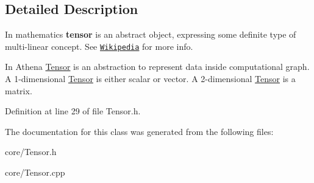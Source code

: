 \subsection{Detailed Description}
In mathematics {\bfseries tensor} is an abstract object, expressing some definite type of multi-\/linear concept. See \href{https://en.wikipedia.org/wiki/Tensor_(intrinsic_definition)}{\tt Wikipedia} for more info. 

In Athena \mbox{\hyperlink{classathena_1_1core_1_1_tensor}{Tensor}} is an abstraction to represent data inside computational graph. A 1-\/dimensional \mbox{\hyperlink{classathena_1_1core_1_1_tensor}{Tensor}} is either scalar or vector. A 2-\/dimensional \mbox{\hyperlink{classathena_1_1core_1_1_tensor}{Tensor}} is a matrix. 

Definition at line 29 of file Tensor.\+h.



The documentation for this class was generated from the following files\+:\begin{DoxyCompactItemize}
\item 
core/Tensor.\+h\item 
core/Tensor.\+cpp\end{DoxyCompactItemize}
